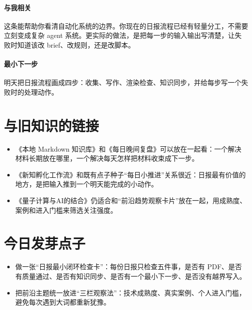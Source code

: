 \documentclass[UTF8,zihao=-4]{ctexart}
\begin{document}
\paragraph{与我相关} 这条能帮助你看清自动化系统的边界。你现在的日报流程已经有轻量分工，不需要立刻变成复杂 agent 系统。更实际的做法，是把每一步的输入输出写清楚，让失败时知道该改 brief、改规则，还是改脚本。
\paragraph{最小下一步} 明天把日报流程画成四步：收集、写作、渲染检查、知识同步，并给每步写一个失败时的处理动作。
\section*{与旧知识的链接}
\begin{itemize}[leftmargin=2em]
\item 《本地 Markdown 知识库》和《每日晚间复盘》可以放在一起看：一个解决材料长期放在哪里，一个解决每天怎样把材料收束成下一步。
\item 《新知孵化工作流》和既有点子种子“每日小推进”关系很近：日报最有价值的地方，是把输入推到一个明天能完成的小动作。
\item 《量子计算与AI的结合》仍适合和“前沿趋势观察卡片”放在一起，用成熟度、案例和进入门槛来筛选关注强度。
\end{itemize}
\section*{今日发芽点子}
\begin{itemize}[leftmargin=2em]
\item 做一张“日报最小闭环检查卡”：每份日报只检查五件事，是否有 PDF、是否有质量通过、是否有知识同步、是否有一个最小下一步、是否没有越界写入。
\item 把前沿主题统一放进“三栏观察法”：技术成熟度、真实案例、个人进入门槛，避免每次遇到大词都重新犹豫。
\end{itemize}
\end{document}
